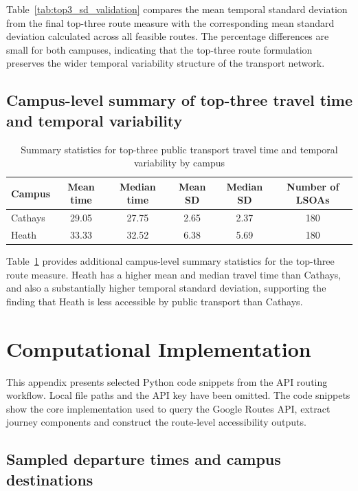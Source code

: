 \documentclass[11pt,a4paper]{article}
\begin{document}
\begin{appendices}
Table~\ref{tab:top3_sd_validation} compares the mean temporal standard deviation from the final top-three route measure with the corresponding mean standard deviation calculated across all feasible routes. The percentage differences are small for both campuses, indicating that the top-three route formulation preserves the wider temporal variability structure of the transport network.

\subsection{Campus-level summary of top-three travel time and temporal variability}

\begin{table}[H]
\centering
\caption{Summary statistics for top-three public transport travel time and temporal variability by campus}
\label{tab:top3_time_sd_summary}
\begin{tabular}{lccccc}
\toprule
Campus & Mean time & Median time & Mean SD & Median SD & Number of LSOAs \\
\midrule
Cathays & 29.05 & 27.75 & 2.65 & 2.37 & 180 \\
Heath & 33.33 & 32.52 & 6.38 & 5.69 & 180 \\
\bottomrule
\end{tabular}
\end{table}

Table~\ref{tab:top3_time_sd_summary} provides additional campus-level summary statistics for the top-three route measure. Heath has a higher mean and median travel time than Cathays, and also a substantially higher temporal standard deviation, supporting the finding that Heath is less accessible by public transport than Cathays.
\section{Computational Implementation}
\label{app:computational_implementation}

This appendix presents selected Python code snippets from the API routing workflow. Local file paths and the API key have been omitted. The code snippets show the core implementation used to query the Google Routes API, extract journey components and construct the route-level accessibility outputs.

\subsection*{Sampled departure times and campus destinations}


\end{appendices}
\end{document}
